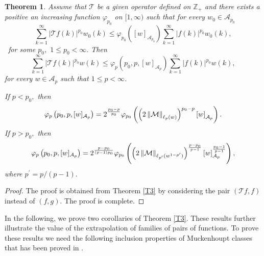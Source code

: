 \documentclass[a4paper]{amsart}
\theoremstyle{plain}
\newtheorem{theorem}{Theorem}[section]
\numberwithin{equation}{section}
\begin{document}
\begin{theorem}
Assume that $\mathcal{T}$ be a given operator defined on $\mathbb{Z}_{+}$
and there exists a positive an increasing function $\mathcal{\varphi }%
_{p_{0}}$ on $[1,\infty )$ such that for every $w_{0}\in \mathcal{A}_{p_{0}}$%
\begin{equation*}
\sum_{k=1}^{\infty }\left\vert \mathcal{T}f(k)\right\vert
^{p_{0}}w_{0}(k)\leq \varphi _{p_{0}}\left( \left[ w\right] _{\mathcal{A}%
_{p_{0}}}\right) \sum_{k=1}^{\infty }\left\vert f(k)\right\vert
^{p_{0}}w_{0}(k),
\end{equation*}%
\ for some $p_{0},$ $1\leq p_{0}<\infty .$ Then 
\begin{equation*}
\sum_{k=1}^{\infty }\left\vert \mathcal{T}f(k)\right\vert ^{p_{0}}w(k)\leq 
\mathcal{\varphi }_{p}\left( p_{0},p,[w]_{\mathcal{A}_{p}}\right)
\sum_{k=1}^{\infty }\left\vert f(k)\right\vert ^{p_{0}}w(k),
\end{equation*}%
for every $w\in \mathcal{A}_{p}$ such that $1\leq p<\infty $.

If $p<p_{0},$ then 
\begin{equation*}
\mathcal{\varphi }_{p}\left( p_{0},p,[w]_{\mathcal{A}_{p}}\right) =2^{\frac{%
p_{0}-p}{p_{0}}}\mathcal{\varphi }_{p_{0}}\left( \left( 2\left\Vert \mathcal{%
M}\right\Vert _{\ell _{p}(w)}\right) ^{p_{0}-p}\left[ w\right] _{\mathcal{A}%
_{p}}\right) .
\end{equation*}%
If $p>p_{0},$ then 
\begin{equation*}
\mathcal{\varphi }_{p}\left( p_{0},p,[w]_{\mathcal{A}_{p}}\right) =2^{\frac{%
p-p_{0}}{\left( p-1\right) p_{0}}}\mathcal{\varphi }_{p_{0}}\left( \left(
2\left\Vert \mathcal{M}\right\Vert _{\ell _{p^{\prime }}(w^{1-p^{\prime
}})}\right) ^{\frac{p-p_{0}}{p-1}}\left[ w\right] _{\mathcal{A}_{p}}^{\frac{%
p_{0}-1}{p-1}}\right) ,
\end{equation*}%
where $p^{\prime }=p/\left( p-1\right) .$
\end{theorem}

\begin{proof}
The proof is obtained from Theorem \ref{T3} by considering the pair $(%
\mathcal{T}f,f)$ instead of $(f,g).$ The proof is complete.
\end{proof}

In the following, we prove two corollaries of Theorem \ref{T3}. These
results further illustrate the value of the extrapolation of families of
pairs of functions. To prove these results we need the following inclusion
properties of Muckenhoupt classes that has been proved in \cite{samir}.
\end{document}
